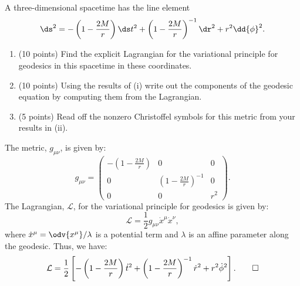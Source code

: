 \renewcommand\L{\mathcal{L}}
\newcommand\G{\tilde{\Gamma}}
\begin{problem}[1]
  A three-dimensional spacetime has the line element
  \[%
    \ds^2 = -\left(1 - \frac{2M}{r}\right) \ds t^2 + \left(1 - \frac{2M}{r}\right)^{-1} \dr^2 + r^2 \dd{\phi}^2
  .\]%
  \begin{enumerate}
    \item (10 points) Find the explicit Lagrangian for the variational principle for geodesics in this spacetime in these coordinates.
    \item (10 points) Using the results of (i) write out the components of the geodesic equation by computing them from the Lagrangian.
    \item (5 points) Read off the nonzero Christoffel symbols for this metric from your results in (ii).
  \end{enumerate}
\end{problem}

\begin{solution}[(i)]
  The metric, $g_{\mu\nu}$, is given by:
  \[%
    g_{\mu\nu} = \begin{pmatrix}
      -\left(1 - \frac{2M}{r}\right) & 0 & 0 \\
      0 & \left(1 - \frac{2M}{r}\right)^{-1} & 0 \\
      0 & 0 & r^2
    \end{pmatrix}
  .\]%
  The Lagrangian, $\L$, for the variational principle for geodesics is given by:
  \[%
    \L = \frac{1}{2} g_{\mu\nu} \dot{x}^\mu \dot{x}^\nu
  ,\]%
  where $\dot{x}^\mu = \odv{x^\mu}/{\lambda}$ is a potential term and $\lambda$ is an affine parameter along the geodesic. Thus, we have:
  \[%
    \L = \frac{1}{2} \left[-\left(1 - \frac{2M}{r}\right) \dot{t}^2 + \left(1 - \frac{2M}{r}\right)^{-1} \dot{r}^2 + r^2 \dot{\phi}^2 \right]
  .\qedhere\]%
\end{solution}

